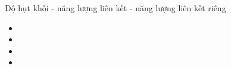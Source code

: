 \begin{dang}{Độ hụt khối - năng lượng liên kết - năng lượng liên kết riêng}
\begin{itemize}
	\item 
	\item 
	\item 
	\item
\end{itemize}
\end{dang}
